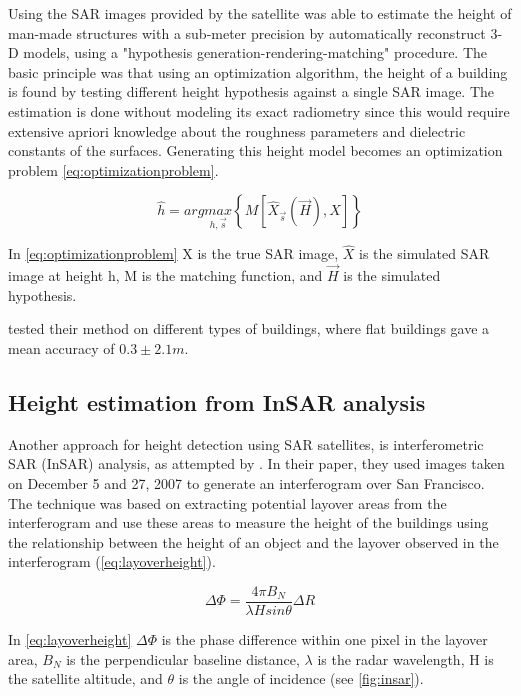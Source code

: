Using the SAR images provided by the satellite \cite{Brunner2008} was able to estimate the height of man-made structures with a sub-meter precision by automatically reconstruct 3-D models, using a "hypothesis generation-rendering-matching" procedure. The basic principle was that using an optimization algorithm, the height of a building is found by testing different height hypothesis against a single SAR image. The estimation is done without modeling its exact radiometry since this would require extensive apriori knowledge about the roughness parameters and dielectric constants of the surfaces. Generating this height model becomes an optimization problem \autoref{eq:optimizationproblem}.

\begin{equation}
	\hat{h} = arg \underset{h,\overrightarrow{s}}{max}\left\{M\left[\hat{X}_{\overrightarrow{s}}(\overrightarrow{H}),X\right]\right\}
	\label{eq:optimizationproblem}
\end{equation}

In \autoref{eq:optimizationproblem} X is the true SAR image, $\hat{X}$ is the simulated SAR image at height h, M is the matching function, and $\overrightarrow{H}$ is the simulated hypothesis.

\cite{Brunner2008} tested their method on different types of buildings, where flat buildings gave a mean accuracy of $0.3 \pm 2.1 m$. 

\subsection{Height estimation from InSAR analysis}
Another approach for height detection using SAR satellites, is interferometric SAR (InSAR) analysis, as attempted by \cite{Liu2015}. In their paper, they used images taken on December 5 and 27, 2007 to generate an interferogram over San Francisco. The technique was based on extracting potential layover areas from the interferogram and use these areas to measure the height of the buildings using the relationship between the height of an object and the layover observed in the interferogram (\autoref{eq:layoverheight}).

\begin{equation}
	\Delta\Phi=\frac{4 \pi B_{N}}{\lambda H sin{\theta}}\Delta R
	\label{eq:layoverheight}
\end{equation}

In \autoref{eq:layoverheight} $\Delta\Phi$ is the phase difference within one pixel in the layover area, $B_{N}$ is the perpendicular baseline distance, $\lambda$ is the radar wavelength, H is the satellite altitude, and $\theta$ is the angle of incidence (see \autoref{fig:insar}).


